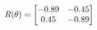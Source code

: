 \documentclass[preview]{standalone}
\begin{document}
\begin{align*}
\special{dvisvgm:raw <g id='unique000'>}R(\theta) = \begin{bmatrix}-0.89 & -0.45\\0.45 & -0.89\end{bmatrix}\special{dvisvgm:raw </g>}
\end{align*}
\end{document}
